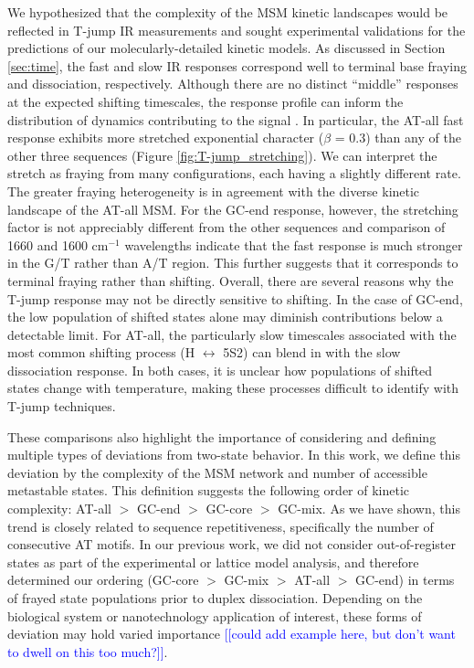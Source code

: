 \documentclass[journal=jpcbfk,manuscript=article]{achemso}
\newcommand*{\noteb}[1]{\textcolor{blue}{[[#1]]}}		%
\begin{document}
We hypothesized that the complexity of the MSM kinetic landscapes would be reflected in T-jump IR measurements and sought experimental validations for the predictions of our molecularly-detailed kinetic models. As discussed in Section \ref{sec:time}, the fast and slow IR responses correspond well to terminal base fraying and dissociation, respectively. Although there are no distinct ``middle'' responses at the expected shifting timescales, the response profile can inform the distribution of dynamics contributing to the signal \citep{Hamm2006StretchedFolding, Johnston2006StretchedDecays}. In particular, the AT-all fast response exhibits more stretched exponential character ($\beta$ = 0.3) than any of the other three sequences (Figure \ref{fig:T-jump_stretching}). We can interpret the stretch as fraying from many configurations, each having a slightly different rate. The greater fraying heterogeneity is in agreement with the diverse kinetic landscape of the AT-all MSM. For the GC-end response, however, the stretching factor is not appreciably different from the other sequences and comparison of 1660 and 1600 cm$^{-1}$ wavelengths indicate that the fast response is much stronger in the G/T rather than A/T region. This further suggests that it corresponds to terminal fraying rather than shifting. Overall, there are several reasons why the T-jump response may not be directly sensitive to shifting. In the case of GC-end, the low population of shifted states alone may diminish contributions below a detectable limit. For AT-all, the particularly slow timescales associated with the most common shifting process (H $\leftrightarrow$ 5S2) can blend in with the slow dissociation response. In both cases, it is unclear how populations of shifted states change with temperature, making these processes difficult to identify with T-jump techniques. 

These comparisons also highlight the importance of considering and defining multiple types of deviations from two-state behavior. In this work, we define this deviation by the complexity of the MSM network and number of accessible metastable states. This definition suggests the following order of kinetic complexity: AT-all $>$ GC-end $>$ GC-core $>$ GC-mix. As we have shown, this trend is closely related to sequence repetitiveness, specifically the number of consecutive AT motifs. In our previous work, we did not consider out-of-register states as part of the experimental or lattice model analysis, and therefore determined our ordering (GC-core $>$ GC-mix $>$ AT-all $>$ GC-end) in terms of frayed state populations prior to duplex dissociation\citep{Sanstead2016, Sanstead2018DirectDehybridization}. Depending on the biological system or nanotechnology application of interest, these forms of deviation may hold varied importance \noteb{could add example here, but don't want to dwell on this too much?}.
\end{document}
